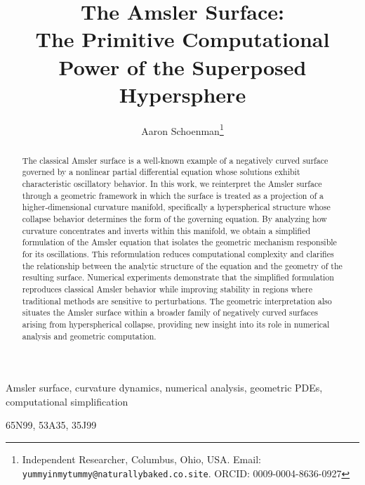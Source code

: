 \documentclass[final,onefignum,onetabnum]{siamart}
\title{The Amsler Surface:\\
The Primitive Computational Power of the Superposed Hypersphere}
\author{
Aaron Schoenman\thanks{Independent Researcher, Columbus, Ohio, USA.
Email: \texttt{yummyinmytummy@naturallybaked.co.site}. ORCID: 0009-0004-8636-0927}
}
\begin{document}
\maketitle

\begin{abstract}
The classical Amsler surface is a well‑known example of a negatively curved surface governed by a nonlinear partial differential equation whose solutions exhibit characteristic oscillatory behavior. In this work, we reinterpret the Amsler surface through a geometric framework in which the surface is treated as a projection of a higher‑dimensional curvature manifold, specifically a hyperspherical structure whose collapse behavior determines the form of the governing equation. By analyzing how curvature concentrates and inverts within this manifold, we obtain a simplified formulation of the Amsler equation that isolates the geometric mechanism responsible for its oscillations. This reformulation reduces computational complexity and clarifies the relationship between the analytic structure of the equation and the geometry of the resulting surface. Numerical experiments demonstrate that the simplified formulation reproduces classical Amsler behavior while improving stability in regions where traditional methods are sensitive to perturbations. The geometric interpretation also situates the Amsler surface within a broader family of negatively curved surfaces arising from hyperspherical collapse, providing new insight into its role in numerical analysis and geometric computation.
\end{abstract}

\begin{keywords}
Amsler surface, curvature dynamics, numerical analysis, geometric PDEs, computational simplification
\end{keywords}

\begin{AMS}
65N99, 53A35, 35J99
\end{AMS}

\tableofcontents
\clearpage
\end{document}
